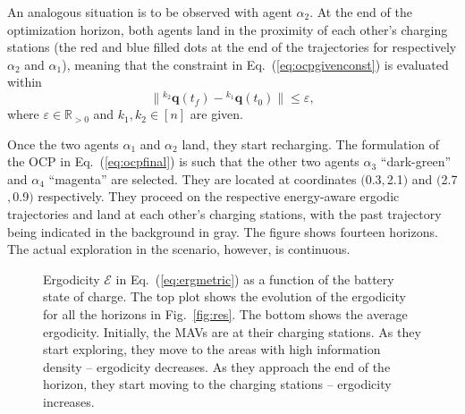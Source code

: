 \documentclass[letterpaper,10pt,conference,twoside]{IEEEtran}
\theoremstyle{definition}
\begin{document}
An analogous situation is to be observed with agent $\alpha_2$. At the end of the optimization horizon, both agents land in the proximity of each other's charging stations (the red and blue filled dots at the end of the trajectories for respectively $\alpha_2$ and $\alpha_1$), meaning that the constraint in Eq.~(\ref{eq:ocpgivenconst}) is evaluated within
\begin{equation}
  \lVert{}^{k_2}\mathbf{q}(t_f)-{}^{k_1}\mathbf{q}(t_0)\rVert\leq\varepsilon,
\end{equation} 
where $\varepsilon\in\mathbb{R}_{>0}$ and $k_1,k_2\in[n]$ are given.

Once the two agents $\alpha_1$ and $\alpha_2$ land, they start recharging. The formulation of the OCP in Eq.~(\ref{eq:ocpfinal}) is such that the other two agents $\alpha_3$ ``dark-green'' and $\alpha_4$ ``magenta'' are selected. They are located at coordinates $($0.3$,$2.1$)$ and $($2.7$,$0.9$)$ respectively. They proceed on the respective energy-aware ergodic trajectories and land at each other's charging stations, with the past trajectory being indicated in the background in gray. The figure shows fourteen horizons. The actual exploration in the scenario, however, is continuous. 

\begin{figure}[t!]
  \begin{minipage}[t!]{.5\columnwidth}
    \vspace*{-.2cm}
    
  \end{minipage}
  \begin{minipage}[c]{.48\columnwidth}
    \vspace*{.05cm}
    \caption{Ergodicity $\mathcal{E}$ in Eq.~(\ref{eq:ergmetric}) as a function of the battery state of charge. The top plot shows the evolution of the ergodicity for all the horizons in Fig.~\ref{fig:res}. The bottom shows the average ergodicity. Initially, the MAVs are at their charging stations. As they start exploring, they move to the areas with high information density -- ergodicity decreases. As they approach the end of the horizon, they start moving to the charging stations -- ergodicity increases.}
    \label{fig:ergo}
  \end{minipage}
  \vspace*{-.3cm}
\end{figure}


\end{document}
